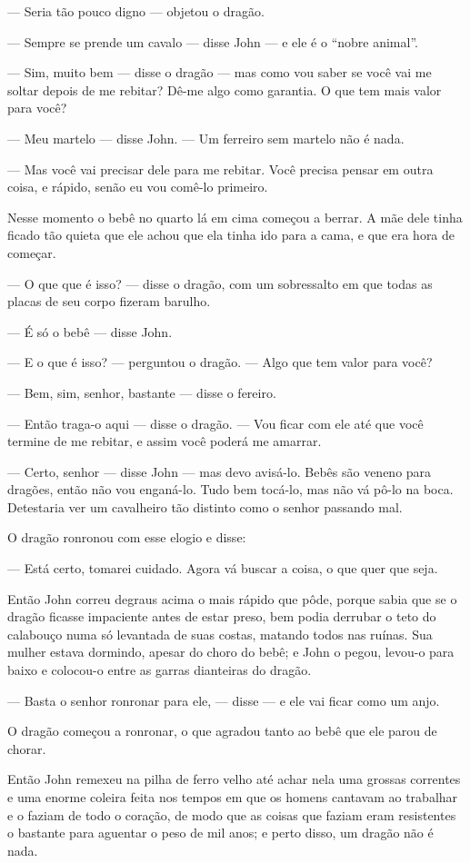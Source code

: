 — Seria tão pouco digno — objetou o dragão.

— Sempre se prende um cavalo — disse John — e ele é o “nobre animal”. 

— Sim, muito bem — disse o dragão — mas como vou saber se você vai me
soltar depois de me rebitar? Dê-me algo como garantia. O que tem mais
valor para você? 

— Meu martelo — disse John. — Um ferreiro sem martelo não é nada. 

— Mas você vai precisar dele para me rebitar. Você precisa pensar em
outra coisa, e rápido, senão eu vou comê-lo primeiro. 

Nesse momento o bebê no quarto lá em cima começou a berrar. A mãe dele
tinha ficado tão quieta que ele achou que ela tinha ido para a cama,
e que era hora de começar. 

— O que que é isso? — disse o dragão, com um sobressalto em que todas
as placas de seu corpo fizeram barulho. 

— É só o bebê — disse John.

— E o que é isso? — perguntou o dragão. — Algo que tem valor para
você?

— Bem, sim, senhor, bastante — disse o fereiro.

— Então traga-o aqui — disse o dragão. — Vou ficar com ele até que
você termine de me rebitar, e assim você poderá me amarrar. 

— Certo, senhor — disse John — mas devo avisá-lo. Bebês são veneno
para dragões, então não vou enganá-lo. Tudo bem tocá-lo, mas não vá
pô-lo na boca. Detestaria ver um cavalheiro tão distinto como o
senhor passando mal.

O dragão ronronou com esse elogio e disse:

— Está certo, tomarei cuidado. Agora vá buscar a coisa, o que quer que
seja.

Então John correu degraus acima o mais rápido que pôde, porque sabia
que se o dragão ficasse impaciente antes de estar preso, bem podia
derrubar o teto do calabouço numa só levantada de suas costas,
matando todos nas ruínas. Sua mulher estava dormindo, apesar do choro
do bebê; e John o pegou, levou-o para baixo e colocou-o entre as
garras dianteiras do dragão.

— Basta o senhor ronronar para ele, — disse — e ele vai ficar como um
anjo.

O dragão começou a ronronar, o que agradou tanto ao bebê que ele parou
de chorar.

Então John remexeu na pilha de ferro velho até achar nela uma grossas
correntes e uma enorme coleira feita nos tempos em que os homens
cantavam ao trabalhar e o faziam de todo o coração, de modo que as
coisas que faziam eram resistentes o bastante para aguentar o peso de
mil anos; e perto disso, um dragão não é nada. 

